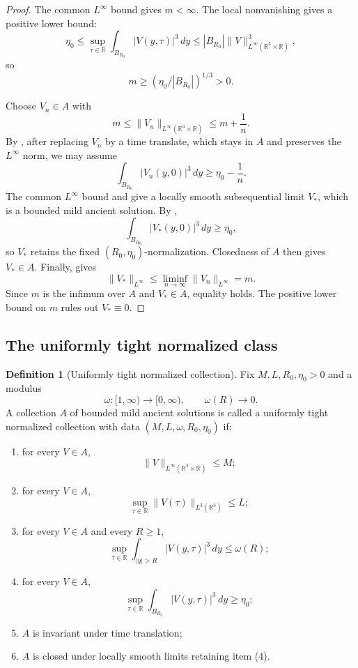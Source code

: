 \documentclass[11pt]{amsart}
\theoremstyle{plain}
\theoremstyle{definition}
\newtheorem{definition}[theorem]{Definition}
\theoremstyle{remark}
\numberwithin{equation}{section}
\newcommand{\R}{\mathbb R}
\begin{document}
\begin{proof}
The common \(L^\infty\) bound gives \(m<\infty\).  The local nonvanishing gives
a positive lower bound:
\[
   \eta_0
   \le
   \sup_{\tau\in\R}\int_{B_{R_0}}|V(y,\tau)|^3\,dy
   \le
   |B_{R_0}|\|V\|_{L^\infty(\R^3\times\R)}^3,
\]
so
\[
   m\ge \left(\eta_0/|B_{R_0}|\right)^{1/3}>0.
\]

Choose \(V_n\in A\) with
\[
   m\le \|V_n\|_{L^\infty(\R^3\times\R)}\le m+\frac1n .
\]
By , after replacing \(V_n\) by a time translate,
which stays in \(A\) and preserves the \(L^\infty\) norm, we may assume
\[
   \int_{B_{R_0}}|V_n(y,0)|^3\,dy\ge \eta_0-\frac1n .
\]
The common \(L^\infty\) bound and  give a
locally smooth subsequential limit \(V_*\), which is a bounded mild ancient
solution.  By ,
\[
   \int_{B_{R_0}}|V_*(y,0)|^3\,dy\ge\eta_0,
\]
so \(V_*\) retains the fixed \((R_0,\eta_0)\)-normalization.  Closedness of
\(A\) then gives \(V_*\in A\).  Finally,  gives
\[
   \|V_*\|_{L^\infty}
   \le
   \liminf_{n\to\infty}\|V_n\|_{L^\infty}
   =m.
\]
Since \(m\) is the infimum over \(A\) and \(V_*\in A\), equality holds.  The
positive lower bound on \(m\) rules out \(V_*\equiv0\).
\end{proof}

\subsection{The uniformly tight normalized class}

\begin{definition}[Uniformly tight normalized collection]
\label{def:tight-normalized-collection}
Fix \(M,L,R_0,\eta_0>0\) and a modulus
\[
   \omega:[1,\infty)\to[0,\infty),
   \qquad \omega(R)\to0.
\]
A collection \(A\) of bounded mild ancient solutions is called a uniformly
tight normalized collection with data \((M,L,\omega,R_0,\eta_0)\) if:
\begin{enumerate}[label=\textup{(\arabic*)}]
\item for every \(V\in A\),
\[
   \|V\|_{L^\infty(\R^3\times\R)}\le M;
\]
\item for every \(V\in A\),
\[
   \sup_{\tau\in\R}\|V(\tau)\|_{L^3(\R^3)}\le L;
\]
\item for every \(V\in A\) and every \(R\ge1\),
\[
   \sup_{\tau\in\R}
   \int_{|y|>R}|V(y,\tau)|^3\,dy\le \omega(R);
\]
\item for every \(V\in A\),
\[
   \sup_{\tau\in\R}
   \int_{B_{R_0}}|V(y,\tau)|^3\,dy\ge\eta_0;
\]
\item \(A\) is invariant under time translation;
\item \(A\) is closed under locally smooth limits retaining item \textup{(4)}.
\end{enumerate}
\end{definition}
\end{document}
